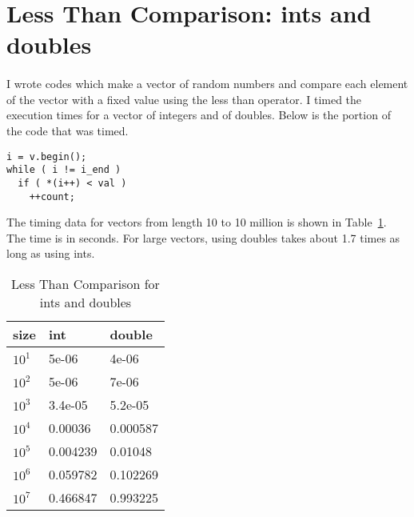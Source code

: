 \documentclass{article}
\begin{document}
\section{Less Than Comparison: ints and doubles}


\paragraph{}
I wrote codes which make a vector of random numbers and compare each
element of the vector with a fixed value using the less than operator.
I timed the execution times for a vector of integers and of doubles.
Below is the portion of the code that was timed.  

\begin{verbatim}
i = v.begin();
while ( i != i_end )
  if ( *(i++) < val )
    ++count;
\end{verbatim}

The timing data for vectors from length 10 to 10 million is shown in
Table~\ref{int_vs_double}.  The time is in seconds.  For large vectors, 
using doubles takes about 1.7 times as long as using ints.

\begin{table}[h!]
\begin{center}
\begin{tabular}{|l|l|l|}
\hline
size &  int &           double \\
\hline
\hline
$10^1$ &   5e-06 &         4e-06 \\
\hline
$10^2$ &   5e-06 &         7e-06 \\
\hline
$10^3$ &   3.4e-05 &       5.2e-05 \\
\hline
$10^4$ &   0.00036 &       0.000587 \\
\hline
$10^5$ &   0.004239 &      0.01048 \\
\hline
$10^6$ &   0.059782 &      0.102269 \\
\hline
$10^7$ &   0.466847 &      0.993225 \\
\hline
\end{tabular}
\caption{Less Than Comparison for ints and doubles}
\label{int_vs_double}
\end{center}
\end{table}
\end{document}
